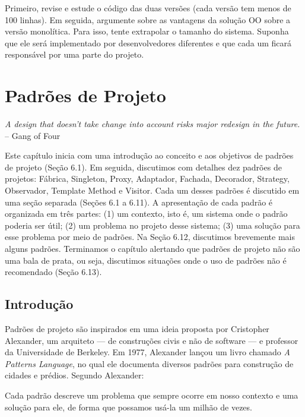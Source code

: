 \documentclass[
  11pt,
  twoside]{book}
\renewenvironment{quote}{\centering \vspace{1.5ex} \begin{tcolorbox}[colback=backcolor, width=4.9in]}{\end{tcolorbox}}
\begin{document}
Primeiro, revise e estude o código das duas versões (cada versão tem
menos de 100 linhas). Em seguida, argumente sobre as vantagens da
solução OO sobre a versão monolítica. Para isso, tente extrapolar o
tamanho do sistema. Suponha que ele será implementado por
desenvolvedores diferentes e que cada um ficará responsável por uma
parte do projeto.

\hypertarget{padruxf5es-de-projeto}{%
\chapter{Padrões de Projeto}\label{padruxf5es-de-projeto}}

\begin{quote}
\emph{A design that doesn't take change into account risks major
redesign in the future.} -- Gang of Four
\end{quote}

Este capítulo inicia com uma introdução ao conceito e aos objetivos de
padrões de projeto (Seção 6.1). Em seguida, discutimos com detalhes dez
padrões de projetos: Fábrica, Singleton, Proxy, Adaptador, Fachada,
Decorador, Strategy, Observador, Template Method e Visitor. Cada um
desses padrões é discutido em uma seção separada (Seções 6.1 a 6.11). A
apresentação de cada padrão é organizada em três partes: (1) um
contexto, isto é, um sistema onde o padrão poderia ser útil; (2) um
problema no projeto desse sistema; (3) uma solução para esse problema
por meio de padrões. Na Seção 6.12, discutimos brevemente mais alguns
padrões. Terminamos o capítulo alertando que padrões de projeto não são
uma bala de prata, ou seja, discutimos situações onde o uso de padrões
não é recomendado (Seção 6.13).

\hypertarget{introduuxe7uxe3o-3}{%
\section{Introdução}\label{introduuxe7uxe3o-3}}

 

Padrões de projeto são inspirados em uma ideia proposta por Cristopher
Alexander, um arquiteto --- de construções civis e não de software --- e
professor da Universidade de Berkeley. Em 1977, Alexander lançou um
livro chamado \emph{A Patterns Language}, no qual ele documenta diversos
padrões para construção de cidades e prédios. Segundo Alexander:

\begin{quote}
Cada padrão descreve um problema que sempre ocorre em nosso contexto e
uma solução para ele, de forma que possamos usá-la um milhão de vezes.
\end{quote}
\end{document}
